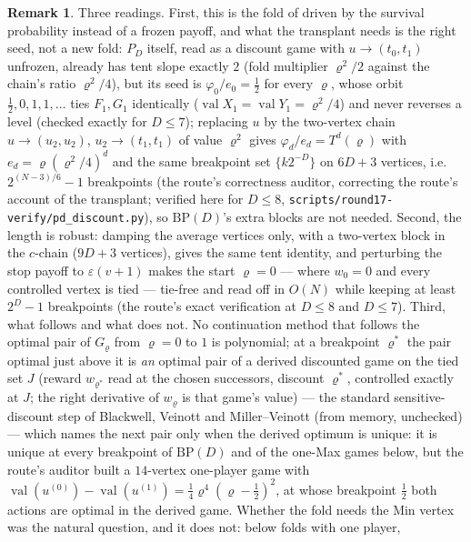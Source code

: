 \documentclass[11pt]{article}
\theoremstyle{plain}
\theoremstyle{definition}
\newtheorem{remark}[theorem]{Remark}
\DeclareMathOperator{\val}{val}
\begin{document}
\begin{remark}\label{rem:discount-fold}
Three readings. First, this is the fold of  driven by the
survival probability instead of a frozen payoff, and what the transplant
needs is the right seed, not a new fold: $P_D$ itself, read as a discount
game with $u\to(t_0,t_1)$ unfrozen, already has tent slope exactly $2$
(fold multiplier $\varrho^{2}/2$ against the chain's ratio $\varrho^{2}/4$),
but its seed is $\varphi_0/e_0=\tfrac12$ for every $\varrho$, whose orbit
$\tfrac12,0,1,1,\dots$ ties $F_1,G_1$ identically ($\val X_1=\val Y_1=
\varrho^{2}/4$) and never reverses a level (checked exactly for $D\le7$);
replacing $u$ by the two-vertex chain $u\to(u_2,u_2)$, $u_2\to(t_1,t_1)$
of value $\varrho^{2}$ gives $\varphi_d/e_d=T^{d}(\varrho)$ with
$e_d=\varrho(\varrho^{2}/4)^{d}$ and the same breakpoint set $\{k2^{-D}\}$
on $6D+3$ vertices, i.e.\ $2^{(N-3)/6}-1$ breakpoints (the route's
correctness auditor, correcting the route's account of the transplant;
verified here for $D\le8$, \texttt{scripts/round17-verify/pd\_discount.py}),
so $\mathrm{BP}(D)$'s extra blocks are not needed. Second, the length is
robust: damping the average vertices only, with a two-vertex block in the
$c$-chain ($9D+3$ vertices), gives the same tent identity, and perturbing
the stop payoff to $\varepsilon(v+1)$ makes the start $\varrho=0$ --- where
$w_0=0$ and every controlled vertex is tied --- tie-free and read off in
$O(N)$ while keeping at least $2^{D}-1$ breakpoints (the route's exact
verification at $D\le8$ and $D\le7$). Third, what follows and what does not.
No continuation method that follows the optimal pair of $G_{\varrho}$ from
$\varrho=0$ to $1$ is polynomial; at a breakpoint $\varrho^{\ast}$ the pair
optimal just above it is \emph{an} optimal pair of a derived discounted game
on the tied set $J$ (reward $w_{\varrho^{\ast}}$ read at the chosen
successors, discount $\varrho^{\ast}$, controlled exactly at $J$; the
right derivative of $w_{\varrho}$ is that game's value) --- the standard
sensitive-discount step of Blackwell, Veinott and Miller--Veinott (from
memory, unchecked) --- which names the next pair only when the derived
optimum is unique: it is unique at every breakpoint of $\mathrm{BP}(D)$ and
of the one-Max games below, but the route's auditor built a $14$-vertex
one-player game with $\val(u^{(0)})-\val(u^{(1)})=\tfrac14\varrho^{4}(\varrho-\tfrac12)^{2}$,
at whose breakpoint $\tfrac12$ both actions are optimal in the derived
game. Whether the fold needs the Min vertex was the natural question,
and it does not:  below folds with one player,

\end{remark}
\end{document}
